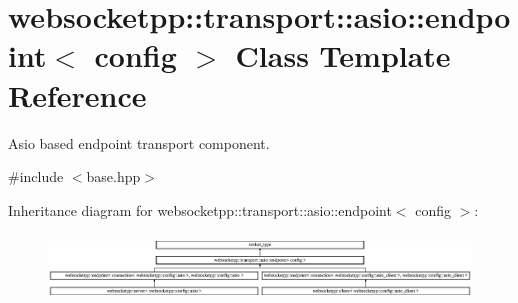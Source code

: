 \hypertarget{classwebsocketpp_1_1transport_1_1asio_1_1endpoint}{}\section{websocketpp\+:\+:transport\+:\+:asio\+:\+:endpoint$<$ config $>$ Class Template Reference}
\label{classwebsocketpp_1_1transport_1_1asio_1_1endpoint}


Asio based endpoint transport component.  




{\ttfamily \#include $<$base.\+hpp$>$}

Inheritance diagram for websocketpp\+:\+:transport\+:\+:asio\+:\+:endpoint$<$ config $>$\+:\begin{figure}[H]
\begin{center}
\leavevmode
\includegraphics[height=1.789137cm]{classwebsocketpp_1_1transport_1_1asio_1_1endpoint}
\end{center}
\end{figure}
